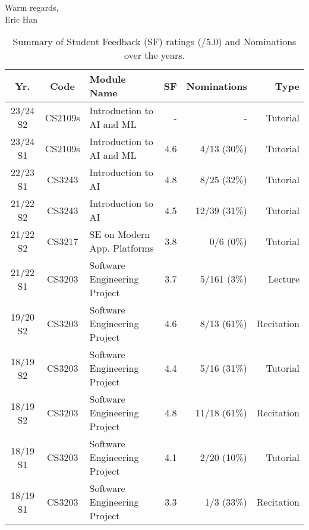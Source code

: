 \documentclass[11pt, a4paper]{article}
\begin{document}
Warm regards,\\
Eric Han\\

\begin{table}[ht]
  \begin{center}
    \caption{Summary of Student Feedback (SF) ratings (/5.0) and Nominations over the years.}
    \label{tab:stufeedback}
    \begin{tabular}{cclrrr}
      \toprule %
      \textbf{Yr.} & \textbf{Code} & \textbf{Module Name}& \textbf{SF} & \textbf{Nominations} & \textbf{Type}\\
      \midrule %
      23/24 S2 & CS2109s & Introduction to AI and ML & - & - & Tutorial \\
      23/24 S1 & CS2109s & Introduction to AI and ML & 4.6 & 4/13 (30\%) & Tutorial \\
      22/23 S1 & CS3243 & Introduction to AI & 4.8 & 8/25 (32\%) & Tutorial \\
      21/22 S2 & CS3243 & Introduction to AI & 4.5 & 12/39 (31\%) & Tutorial \\
      21/22 S2 & CS3217 & SE on Modern App. Platforms & 3.8 & 0/6 (0\%) & Tutorial \\
      21/22 S1 & CS3203 & Software Engineering Project & 3.7 & 5/161 (3\%) & Lecture \\
      19/20 S2 & CS3203 & Software Engineering Project & 4.6 & 8/13 (61\%) & Recitation \\
      18/19 S2 & CS3203 & Software Engineering Project & 4.4 & 5/16 (31\%) & Tutorial \\
      18/19 S2 & CS3203 & Software Engineering Project & 4.8 & 11/18 (61\%) & Recitation \\
      18/19 S1 & CS3203 & Software Engineering Project & 4.1 & 2/20 (10\%) & Tutorial \\
      18/19 S1 & CS3203 & Software Engineering Project & 3.3 & 1/3 (33\%) & Recitation \\
      \bottomrule %
    \end{tabular}
  \end{center}
\end{table}
\end{document}
